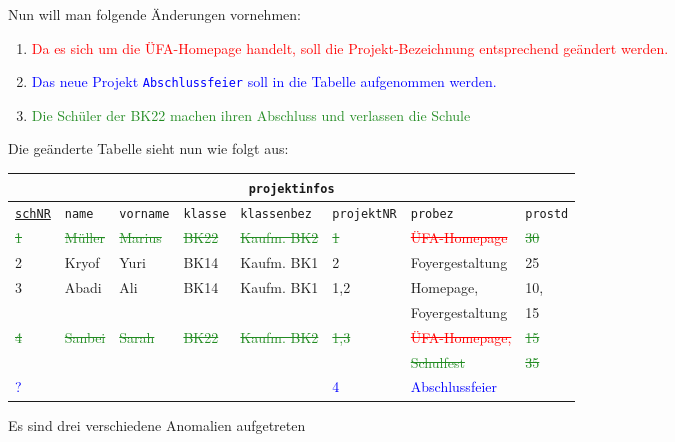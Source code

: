 Nun will man folgende Änderungen vornehmen:
\begin{enumerate}
	\item \textcolor{red}{Da es sich um die ÜFA-Homepage handelt, soll die Projekt-Bezeichnung entsprechend geändert werden.}
	\item \textcolor{blue}{Das neue Projekt \texttt{Abschlussfeier} soll in die Tabelle aufgenommen werden.}
	\item \textcolor{ForestGreen}{Die Schüler der BK22 machen ihren Abschluss und verlassen die Schule}
\end{enumerate}
Die geänderte Tabelle sieht nun wie folgt aus:

\medskip

\begin{tabular}{llllllll}
	\multicolumn{8}{c}{\lstinline!projektinfos!}\\
	\hline
	\underline{\lstinline!schNR!}&\lstinline!name!&\lstinline!vorname!&\lstinline!klasse!&\lstinline!klassenbez!&\lstinline!projektNR!&\lstinline!probez!&\lstinline!prostd!\\
	\hline
	\textcolor{ForestGreen}{\sout{1}} &
	\textcolor{ForestGreen}{\sout{Müller}} &
	\textcolor{ForestGreen}{\sout{Marius}} &
	\textcolor{ForestGreen}{\sout{BK22}} &
	\textcolor{ForestGreen}{\sout{Kaufm. BK2}}&
	\textcolor{ForestGreen}{\sout{1}} &
	\textcolor{red}{\sout{ÜFA-Homepage}} &
	\textcolor{ForestGreen}{\sout{30}} \\
	2 &
	Kryof  &
	Yuri &
	BK14 &
	Kaufm. BK1&
	2 &
	Foyergestaltung &
	25 \\
	3 &
	Abadi &
	Ali &
	BK14 &
	Kaufm. BK1&
	1,2 &
	Homepage,&
	10,\\
	&&&&&&Foyergestaltung&15\\
	\textcolor{ForestGreen}{\sout{4}}&
	\textcolor{ForestGreen}{\sout{Sanbei}}&
	\textcolor{ForestGreen}{\sout{Sarah}}&
	\textcolor{ForestGreen}{\sout{BK22}}&
	\textcolor{ForestGreen}{\sout{Kaufm. BK2}}&
	\textcolor{ForestGreen}{\sout{1,3}}&
	\textcolor{red}{\sout{ÜFA-Homepage,}}&
	\textcolor{ForestGreen}{\sout{15}}\\
	&&&&&&\textcolor{ForestGreen}{\sout{Schulfest}}&\textcolor{ForestGreen}{\sout{35}}\\
	\textcolor{blue}{?}&
	&
	&
	&
	&
	\textcolor{blue}{4} &
	\textcolor{blue}{Abschlussfeier}&
	\\
\end{tabular}\newpage
Es sind drei verschiedene Anomalien aufgetreten
